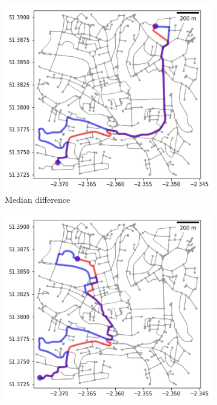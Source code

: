 \documentclass[11pt]{report}
\begin{document}
\begin{figure}[!tb]
\begin{minipage}{1\linewidth}
\begin{subfigure}[t]{.5\linewidth}
            	\includegraphics[width=\textwidth]{images/health_optimal_route_median}
            	\caption{Median difference}
            	\label{fig:route_median}
	   \end{subfigure}
        \end{minipage}
    \begin{minipage}{1\linewidth}
    	\centering
        \begin{subfigure}[t]{.5\linewidth}
            \includegraphics[width=\textwidth]{images/health_optimal_route_max}

\end{subfigure}
\end{minipage}
\end{figure}
\end{document}
